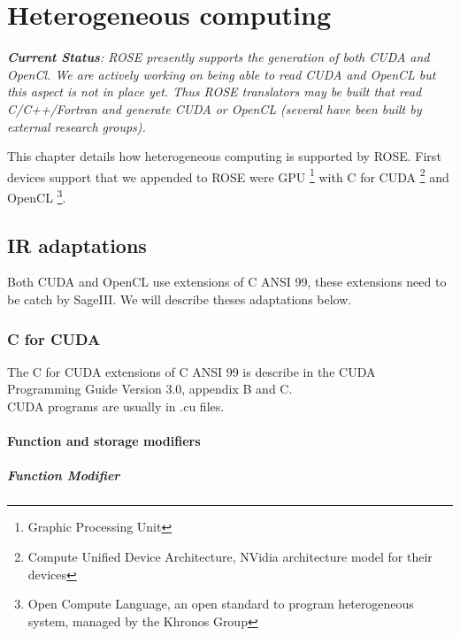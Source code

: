 \chapter{Heterogeneous computing}

\label{heterogeneous:heterogeneous}

{\em {\bf Current Status}: ROSE presently supports the generation of both CUDA and OpenCl.  We
    are actively working on being able to read CUDA and OpenCL but this aspect is not in
    place yet.  Thus ROSE translators may be built that read C/C++/Fortran and generate
    CUDA or OpenCL (several have been built by external research groups).}
\vspace{0.25in}

This chapter details how heterogeneous computing is supported by ROSE. First devices support that we appended to ROSE were GPU \footnote{Graphic Processing Unit}
with C for CUDA \footnote{Compute Unified Device Architecture, NVidia architecture model for their devices} and OpenCL \footnote{Open Compute Language,
an open standard to program heterogeneous system, managed by the Khronos Group}.

	\section{IR adaptations}
	
		Both CUDA and OpenCL use extensions of C ANSI 99, these extensions need to be catch by SageIII. We will describe theses adaptations below.

		\subsection{C for CUDA}
		
			The C for CUDA extensions of C ANSI 99 is describe in the CUDA Programming Guide Version 3.0, appendix B and C.\\
			CUDA programs are usually in .cu files.
		
			\subsubsection{Function and storage modifiers}

				\paragraph{Function Modifier}

